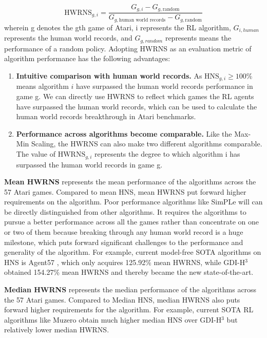\documentclass[nohyperref]{article}
\theoremstyle{plain}
\begin{document}
\begin{equation}
     \text{HWRNS}_{g,i} = \frac{G_{g,i}-G_{g,\text{random}}}{G_{g,\text{human world records}}-G_{g,\text{random}}}
\end{equation}
wherein g denotes the gth game of Atari, i represents the RL algorithm, $G_{i,human}$ represents the human world records, and $G_{g,random}$ represents means the performance of a random policy. Adopting HWRNS as an evaluation metric of algorithm performance has the following advantages:

\begin{enumerate}
    \item \textbf{Intuitive comparison with human world records.} As $\text{HNS}_{g,i} \geq 100\%$ means algorithm $i$ have surpassed the human world records performance in game g. We can directly use HWRNS to reflect which games the RL agents have surpassed the human world records, which can be used to calculate the human world records breakthrough in Atari benchmarks.
    \item \textbf{Performance across algorithms become comparable.} Like the Max-Min Scaling, the HWRNS can also make two different algorithms comparable. The value of $\text{HWRNS}_{g,i}$ represents the degree to which algorithm i has surpassed the human world records in game g.
\end{enumerate}


\textbf{Mean HWRNS} represents the mean performance of the algorithms across the 57 Atari games. Compared to mean HNS, mean HWRNS put forward higher requirements on the algorithm. Poor performance algorithms like SimPLe \citep{modelbasedatari} will can be directly distinguished from other algorithms. It requires the algorithms to pursue a better performance across all the games rather than concentrate on one or two of them because breaking through any human world record is a huge milestone, which puts forward significant challenges to the performance and generality of the algorithm. For example, current model-free SOTA algorithms on HNS is Agent57 \citep{agent57}, which only acquires 125.92\% mean HWRNS, while GDI-H$^3$ obtained 154.27\% mean HWRNS and thereby became the new state-of-the-art.

\textbf{Median HWRNS} represents the median performance of the algorithms across the 57 Atari games. Compared to Median HNS, median HWRNS also puts forward higher requirements for the algorithm. For example, current SOTA RL algorithms like Muzero \citep{muzero} obtain much higher median HNS over GDI-H$^3$ but relatively lower median HWRNS.
\end{document}
